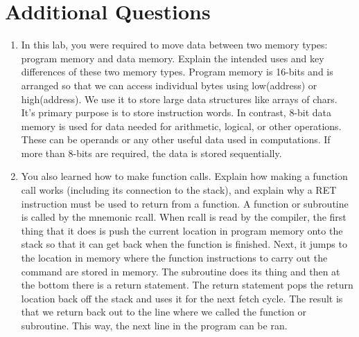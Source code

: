 \documentclass[12pt, letterpaper]{article}
\begin{document}
\section{Additional Questions}
\begin{enumerate}
    \item
    In this lab, you were required to move data between two memory types:
program memory and data memory. Explain the intended uses and key
differences of these two memory types.
\newline \newline
Program memory is 16-bits and is arranged so that we can access individual bytes using low(address) or high(address). We use it to store large data structures like arrays of chars. It's primary purpose is to store instruction words. In contrast, 8-bit data memory is used for data needed for arithmetic, logical, or other operations. These can be operands or any other useful data used in computations. If more than 8-bits are required, the data is stored sequentially.



    \item
    You also learned how to make function calls. Explain how making a function call works (including its connection to the stack), and explain why a RET instruction must be used to return from a function. 
\newline \newline
    A function or subroutine is called by the mnemonic rcall. When rcall is read by the compiler, the first thing that it does is push the current location in program memory onto the stack so that it can get back when the function is finished. Next, it jumps to the location in memory where the function instructions to carry out the command are stored in memory. The subroutine does its thing and then at the bottom there is a return statement. The return statement pops the return location back off the stack and uses it for the next fetch cycle. The result is that we return back out to the line where we called the function or subroutine. This way, the next line in the program can be ran.
    

\end{enumerate}
\end{document}

